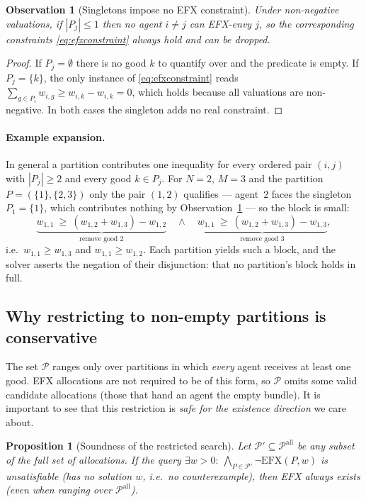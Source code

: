 \documentclass[11pt,a4paper]{article}
\theoremstyle{definition}
\theoremstyle{plain}
\newtheorem{proposition}{Proposition}
\newtheorem{observation}{Observation}
\newcommand{\EFX}{\textsf{EFX}}
\newcommand{\agents}{N}
\newcommand{\goods}{M}
\begin{document}
\begin{observation}[Singletons impose no \EFX{} constraint]
\label{obs:singleton}
Under non-negative valuations, if $|P_j|\leq 1$ then no agent $i\neq j$ can
\EFX-envy $j$, so the corresponding constraints \eqref{eq:efxconstraint} always
hold and can be dropped.
\end{observation}

\begin{proof}
If $P_j=\emptyset$ there is no good $k$ to quantify over and the predicate is
empty. If $P_j=\{k\}$, the only instance of \eqref{eq:efxconstraint} reads
$\sum_{g\in P_i}w_{i,g}\geq w_{i,k}-w_{i,k}=0$, which holds because all
valuations are non-negative. In both cases the singleton adds no real constraint.
\end{proof}

\paragraph{Example expansion.}
In general a partition contributes one inequality for every ordered pair $(i,j)$
with $|P_j|\geq 2$ and every good $k\in P_j$. For $\agents=2$, $\goods=3$ and the
partition $P=(\{1\},\{2,3\})$ only the pair $(1,2)$ qualifies --- agent~$2$ faces
the singleton $P_1=\{1\}$, which contributes nothing by
Observation~\ref{obs:singleton} --- so the block is small:
\[
  \underbrace{w_{1,1}\ \geq\ (w_{1,2}+w_{1,3})-w_{1,2}}_{\text{remove good }2}
  \quad\wedge\quad
  \underbrace{w_{1,1}\ \geq\ (w_{1,2}+w_{1,3})-w_{1,3}}_{\text{remove good }3},
\]
i.e.\ $w_{1,1}\geq w_{1,3}$ and $w_{1,1}\geq w_{1,2}$. Each partition yields such a
block, and the solver asserts the negation of their disjunction: that no
partition's block holds in full.

\subsection{Why restricting to non-empty partitions is conservative}
\label{sec:conservative}

The set $\mathcal{P}$ ranges only over partitions in which \emph{every} agent
receives at least one good. \EFX{} allocations are not required to be of this
form, so $\mathcal{P}$ omits some valid candidate allocations (those that hand
an agent the empty bundle). It is important to see that this restriction is
\emph{safe for the existence direction} we care about.

\begin{proposition}[Soundness of the restricted search]
\label{prop:conservative}
Let $\mathcal{P}'\subseteq\mathcal{P}^{\mathrm{all}}$ be any subset of the full
set of allocations. If the query
$\exists w>0:\ \bigwedge_{P\in\mathcal{P}'}\neg\mathrm{EFX}(P,w)$ is
unsatisfiable (has no solution $w$, i.e.\ no counterexample), then \EFX{} always
exists (even when ranging over $\mathcal{P}^{\mathrm{all}}$).
\end{proposition}
\end{document}
